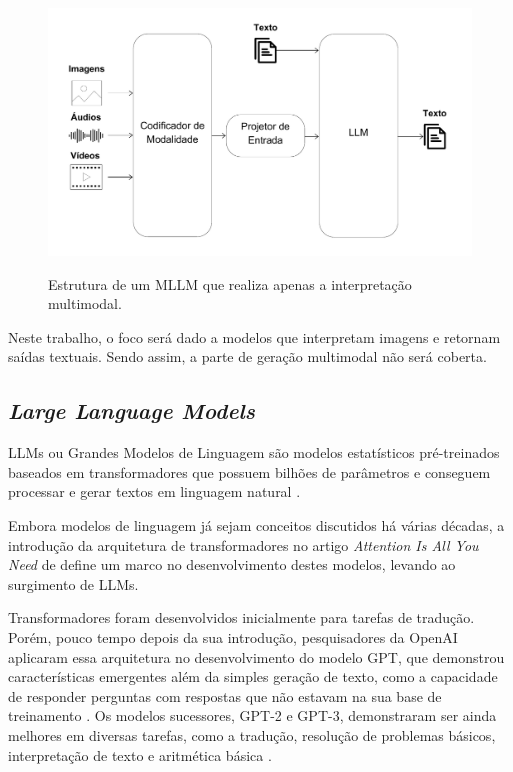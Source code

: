 \begin{figure}[ht]
      \centering
      \caption{\small Estrutura de um \ac{MLLM} que realiza apenas a interpretação multimodal.}
      \includegraphics[width=0.7\columnwidth,keepaspectratio]{images/mllm_structure_encoder_only.pdf}
      \label{fig:mllm_structure_encoder_only}
\end{figure}

Neste trabalho, o foco será dado a modelos que interpretam imagens e retornam saídas textuais. Sendo assim, a parte de geração multimodal não será coberta.

\subsection{\textit{Large Language Models}}

\acp{LLM} ou Grandes Modelos de Linguagem são modelos estatísticos pré-treinados baseados em transformadores que possuem bilhões de parâmetros e conseguem processar e
gerar textos em linguagem natural \cite{llm_survey_2024}.

Embora modelos de linguagem já sejam conceitos discutidos há várias décadas, a introdução da arquitetura de transformadores no artigo \textit{Attention Is All You Need}
de \textcite{transformer} define um marco no desenvolvimento destes modelos, levando ao surgimento de \acp{LLM}.

Transformadores foram desenvolvidos inicialmente para tarefas de tradução. Porém, pouco tempo depois da sua introdução, pesquisadores da OpenAI aplicaram essa arquitetura
no desenvolvimento do modelo \ac{GPT}, que demonstrou características emergentes além da simples geração de texto, como a capacidade de responder perguntas com
respostas que não estavam na sua base de treinamento \cite{gpt1}. Os modelos sucessores, \ac{GPT}-2 e \ac{GPT}-3, demonstraram ser ainda melhores em diversas tarefas,
como a tradução, resolução de problemas básicos, interpretação de texto e aritmética básica \cite{gpt2, gpt3}.

